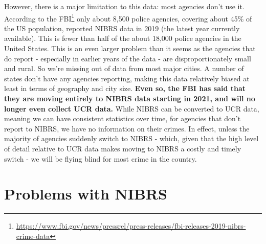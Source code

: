 \documentclass[
]{krantz}
\renewcommand{\href}[2]{#2\footnote{\url{#1}}}
\begin{document}
However, there is a major limitation to this data: most
agencies don't use it.
\href{https://www.fbi.gov/news/pressrel/press-releases/fbi-releases-2019-nibrs-crime-data}{According
to the FBI} only about 8,500 police agencies, covering about
45\% of the US population, reported NIBRS data in 2019 (the
latest year currently available). This is fewer than half of
the about 18,000 police agencies in the United States. This
is an even larger problem than it seems as the agencies that
do report - especially in earlier years of the data - are
disproportionately small and rural. So we're missing out of
data from most major cities. A number of states don't have
any agencies reporting, making this data relatively biased
at least in terms of geography and city size. \textbf{Even
so, the FBI has said that they are moving entirely to NIBRS
data starting in 2021, and will no longer even collect UCR
data.} While NIBRS can be converted to UCR data, meaning we
can have consistent statistics over time, for agencies that
don't report to NIBRS, we have no information on their
crimes. In effect, unless the majority of agencies suddenly
switch to NIBRS - which, given that the high level of detail
relative to UCR data makes moving to NIBRS a costly and
timely switch - we will be flying blind for most crime in
the country.

\section{Problems with NIBRS}\label{problems-with-nibrs}
\end{document}
